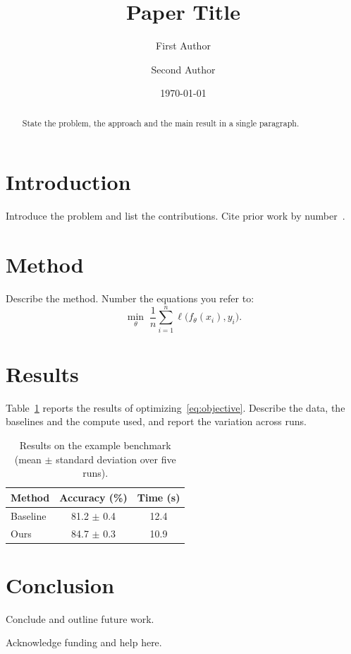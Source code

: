 \documentclass[aps,prl,reprint,amsmath,amssymb]{revtex4-2}
\begin{document}

\title{Paper Title}

\author{First Author}

\author{Second Author}

\date{\today}

\begin{abstract}
State the problem, the approach and the main result in a single
paragraph.
\end{abstract}

\maketitle

\section{Introduction}
Introduce the problem and list the contributions. Cite prior work by
number~\cite{lamport1994latex,knuth1984texbook}.

\section{Method}
Describe the method. Number the equations you refer to:
\begin{equation}
  \label{eq:objective}
  \min_{\theta} \; \frac{1}{n} \sum_{i=1}^{n} \ell\bigl(f_\theta(x_i), y_i\bigr) .
\end{equation}

\section{Results}
Table~\ref{tab:results} reports the results of
optimizing~\eqref{eq:objective}. Describe the data, the baselines and the
compute used, and report the variation across runs.

\begin{table}[!htb]
  \caption{Results on the example benchmark (mean $\pm$ standard deviation over five runs).}
  \label{tab:results}
  \centering
  \begin{tabular}{lcc}
    \toprule
    Method   & Accuracy (\%)  & Time (s) \\
    \midrule
    Baseline & 81.2 $\pm$ 0.4 & 12.4     \\
    Ours     & 84.7 $\pm$ 0.3 & 10.9     \\
    \bottomrule
  \end{tabular}
\end{table}

\section{Conclusion}
Conclude and outline future work.

\begin{acknowledgments}
Acknowledge funding and help here.
\end{acknowledgments}


\end{document}
